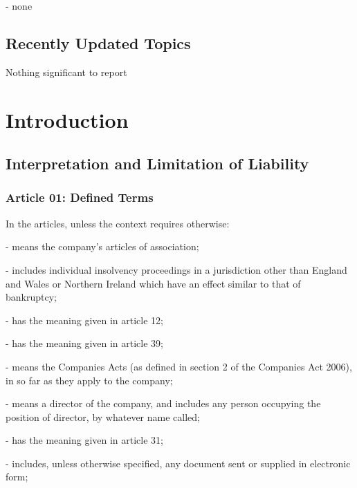 \documentclass[letterpaper,10pt,english]{sphinxmanual}
\begin{document}
 - none


\section{Recently Updated Topics}
\label{\detokenize{releasenotes:recently-updated-topics}}
Nothing significant to report


\chapter{Introduction}
\label{\detokenize{introduction:introduction}}\label{\detokenize{introduction::doc}}

\section{Interpretation and Limitation of Liability}
\label{\detokenize{introduction:interpretation-and-limitation-of-liability}}

\subsection{Article 01: Defined Terms}
\label{\detokenize{introduction:article-01-defined-terms}}
In the articles, unless the context requires otherwise:

 - means the company’s articles of association;

 - includes individual insolvency proceedings in a jurisdiction other than England and Wales or Northern Ireland which have an effect similar to that of bankruptcy;

 - has the meaning given in article 12;

 - has the meaning given in article 39;

 - means the Companies Acts (as defined in section 2 of the Companies Act 2006), in so far as they apply to the company;

 - means a director of the company, and includes any person occupying the position of director, by whatever name called;

 - has the meaning given in article 31;

 - includes, unless otherwise specified, any document sent or supplied in electronic form;
\end{document}
